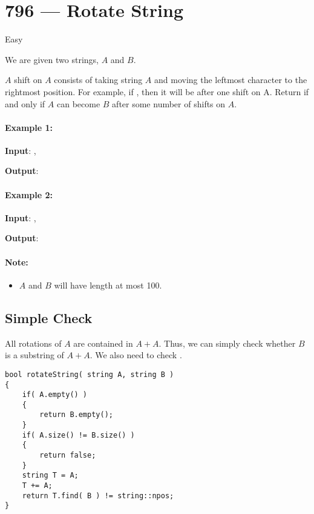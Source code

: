 \section{796 --- Rotate String}

Easy

We are given two strings, $A$ and $B$.

$A$ shift on $A$ consists of taking string $A$ and moving the leftmost character to the rightmost position. For example, if , then it will be  after one shift on A. Return  if and only if $A$ can become $B$ after some number of shifts on $A$.

\paragraph{Example 1:}

\begin{flushleft}
\textbf{Input}: , 

\textbf{Output}: 
\end{flushleft}


\paragraph{Example 2:}

\begin{flushleft}
\textbf{Input}: , 

\textbf{Output}: 
\end{flushleft}

\paragraph{Note:}

\begin{itemize}
\item $A$ and $B$ will have length at most 100.
\end{itemize}

\subsection{Simple Check}
All rotations of $ A $ are contained in $ A + A $. Thus, we can simply check whether $ B $ is a substring of $ A + A $. We also need to check   .
\setcounter{lstlisting}{0}
\begin{lstlisting}[style=customc, caption={Simple Check}]
bool rotateString( string A, string B )
{
    if( A.empty() )
    {
        return B.empty();
    }
    if( A.size() != B.size() )
    {
        return false;
    }
    string T = A;
    T += A;
    return T.find( B ) != string::npos;
}
\end{lstlisting}